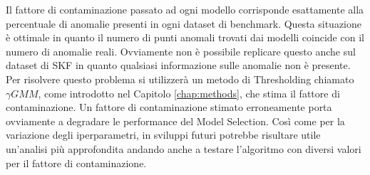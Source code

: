 Il fattore di contaminazione passato ad ogni modello corrisponde esattamente alla percentuale di anomalie presenti in ogni dataset di benchmark. Questa situazione è ottimale in quanto il numero di punti anomali trovati dai modelli coincide con il numero di anomalie reali. Ovviamente non è possibile replicare questo anche sul dataset di SKF in quanto qualsiasi informazione sulle anomalie non è presente. Per risolvere questo problema si utilizzerà un metodo di Thresholding chiamato ${\gamma}GMM$, come introdotto nel Capitolo \ref{chap:methods}, che stima il fattore di contaminazione. Un fattore di contaminazione stimato erroneamente porta ovviamente a degradare le performance del Model Selection. Così come per la variazione degli iperparametri, in sviluppi futuri potrebbe risultare utile un'analisi più approfondita andando anche a testare l'algoritmo con diversi valori per il fattore di contaminazione.




